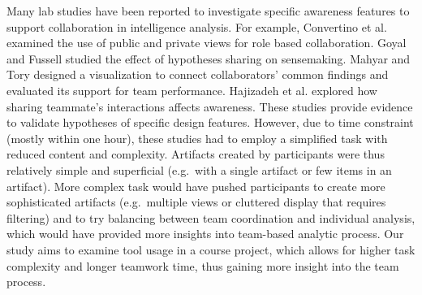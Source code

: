 Many lab studies have been reported to investigate specific awareness features
to support collaboration in intelligence analysis. For example, Convertino et al. \cite{Convertino2011} examined the use of public and private views for role based collaboration. Goyal and
Fussell \cite{Goyal2016} studied the effect of hypotheses sharing on
sensemaking. Mahyar and Tory \cite{Mahyar2013b} designed a
visualization to connect collaborators' common findings and evaluated
its support for team performance. Hajizadeh et al.
\cite{Hajizadeh2013} explored how sharing teammate's interactions
affects awareness. These studies provide evidence to validate hypotheses of specific design
features. However, due to time constraint (mostly within one hour), these studies had to employ
a simplified task with reduced content and complexity. Artifacts created by participants were thus relatively simple and superficial
(e.g.~with a single artifact or few items in an artifact). More complex
task would have pushed participants to create more sophisticated artifacts
(e.g.~multiple views or cluttered display that requires filtering) and
to try balancing between team coordination and individual analysis, which
would have provided more insights into team-based analytic process. Our study aims to examine tool usage in a course project, which allows for higher task complexity and longer teamwork time, thus gaining more insight into the team process.

